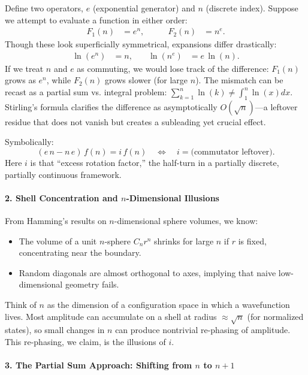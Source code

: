 \documentclass{article}
\begin{document}
Define two operators, $e$ (exponential generator) and $n$ (discrete index). Suppose we attempt to evaluate a function in either order:
\begin{align*}
F_1(n) &= e^n,\quad\quad &F_2(n) &= n^e.
\end{align*}
Though these look superficially symmetrical, expansions differ drastically:
\begin{align*}
\ln(e^n) &= n,\quad&\ln(n^e) &= e\,\ln(n).
\end{align*}
If we treat $n$ and $e$ as commuting, we would lose track of the difference: $F_1(n)$ grows as $e^n$, while $F_2(n)$ grows slower (for large $n$). The mismatch can be recast as a partial sum vs. integral problem: $\sum_{k=1}^n\ln(k)\neq \int_1^n\ln(x)dx$. Stirling’s formula clarifies the difference as asymptotically $O(\sqrt{n})$---a leftover residue that does not vanish but creates a subleading yet crucial effect.

Symbolically:
\[
(e\,n - n\,e)\,f(n) = i\,f(n)\quad\Longleftrightarrow\quad i=\text{(commutator leftover)}.
\]
Here $i$ is that “excess rotation factor,” the half-turn in a partially discrete, partially continuous framework.

\paragraph{2. Shell Concentration and $n$-Dimensional Illusions}

From Hamming’s results on $n$-dimensional sphere volumes, we know:
\begin{itemize}
\item The volume of a unit $n$-sphere $C_nr^n$ shrinks for large $n$ if $r$ is fixed, concentrating near the boundary.\vspace{-4pt}
\item Random diagonals are almost orthogonal to axes, implying that naive low-dimensional geometry fails.
\end{itemize}
Think of $n$ as the dimension of a configuration space in which a wavefunction lives. Most amplitude can accumulate on a shell at radius $\approx\sqrt{n}$ (for normalized states), so small changes in $n$ can produce nontrivial re-phasing of amplitude. This re-phasing, we claim, is the illusions of $i$.

\paragraph{3. The Partial Sum Approach: Shifting from $n$ to $n+1$}
\end{document}
